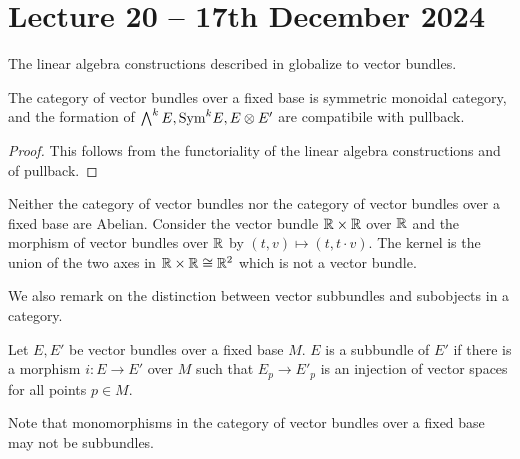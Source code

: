 \section{Lecture 20 -- 17th December 2024}\label{sec: lecture 20}
The linear algebra constructions described in  globalize to vector bundles. 
\begin{theorem}\label{def: omnibus linear algebra}
    The category of vector bundles over a fixed base is symmetric monoidal category, and the formation of $\bigwedge^{k}E, \mathrm{Sym}^{k}E, E\otimes E'$ are compatibile with pullback. 
\end{theorem}
\begin{proof}
    This follows from the functoriality of the linear algebra constructions and of pullback. 
\end{proof}
\begin{remark}
    Neither the category of vector bundles nor the category of vector bundles over a fixed base are Abelian. Consider the vector bundle $\mathbb{R}\times\mathbb{R}$ over $\mathbb{R}$ and the morphism of vector bundles over $\mathbb{R}$ by $(t,v)\mapsto(t,t\cdot v)$. The kernel is the union of the two axes in $\mathbb{R}\times\mathbb{R}\cong\mathbb{R}^{2}$ which is not a vector bundle. 
\end{remark}
We also remark on the distinction between vector subbundles and subobjects in a category. 
\begin{definition}[Subbundle]\label{def: subbundle}
    Let $E,E'$ be vector bundles over a fixed base $M$. $E$ is a subbundle of $E'$ if there is a morphism $i:E\to E'$ over $M$ such that $E_{p}\to E'_{p}$ is an injection of vector spaces for all points $p\in M$. 
\end{definition}
Note that monomorphisms in the category of vector bundles over a fixed base may not be subbundles. 

